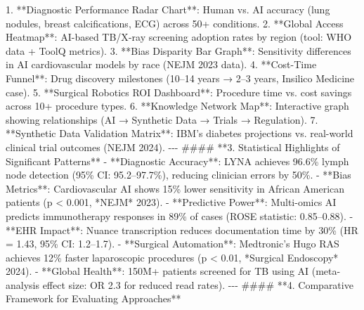 \documentclass{article}%
\begin{document}
%
1. **Diagnostic Performance Radar Chart**: Human vs. AI accuracy (lung nodules, breast calcifications, ECG) across 50+ conditions.\newline%
%
2. **Global Access Heatmap**: AI{-}based TB/X{-}ray screening adoption rates by region (tool: WHO data + ToolQ metrics).\newline%
%
3. **Bias Disparity Bar Graph**: Sensitivity differences in AI cardiovascular models by race (NEJM 2023 data).\newline%
%
4. **Cost{-}Time Funnel**: Drug discovery milestones (10–14 years → 2–3 years, Insilico Medicine case).\newline%
%
5. **Surgical Robotics ROI Dashboard**: Procedure time vs. cost savings across 10+ procedure types.\newline%
%
6. **Knowledge Network Map**: Interactive graph showing relationships (AI → Synthetic Data → Trials → Regulation).\newline%
%
7. **Synthetic Data Validation Matrix**: IBM’s diabetes projections vs. real{-}world clinical trial outcomes (NEJM 2024).\newline%
%
{-}{-}{-}\newline%
%
\#\#\#\# **3. Statistical Highlights of Significant Patterns**\newline%
%
{-} **Diagnostic Accuracy**: LYNA achieves 96.6\% lymph node detection (95\% CI: 95.2–97.7\%), reducing clinician errors by 50\%.\newline%
%
{-} **Bias Metrics**: Cardiovascular AI shows 15\% lower sensitivity in African American patients (p < 0.001, *NEJM* 2023).\newline%
%
{-} **Predictive Power**: Multi{-}omics AI predicts immunotherapy responses in 89\% of cases (ROSE statistic: 0.85–0.88).\newline%
%
{-} **EHR Impact**: Nuance transcription reduces documentation time by 30\% (HR = 1.43, 95\% CI: 1.2–1.7).\newline%
%
{-} **Surgical Automation**: Medtronic’s Hugo RAS achieves 12\% faster laparoscopic procedures (p < 0.01, *Surgical Endoscopy* 2024).\newline%
%
{-} **Global Health**: 150M+ patients screened for TB using AI (meta{-}analysis effect size: OR 2.3 for reduced read rates).\newline%
%
{-}{-}{-}\newline%
%
\#\#\#\# **4. Comparative Framework for Evaluating Approaches**\newline%
%
\end{document}
